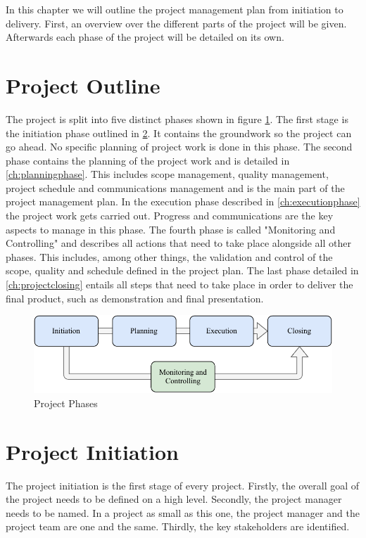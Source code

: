 In this chapter we will outline the project management plan from initiation to delivery. First, an overview over the different parts of the project will be given. Afterwards each phase of the project will be detailed on its own.

\section{Project Outline}
\label{ch:projectplanoutline}

The project is split into five distinct phases shown in figure \ref{fig:projectphases}. The first stage is the initiation phase outlined in \ref{ch:projectinitiation}. It contains the groundwork so the project can go ahead. No specific planning of project work is done in this phase. The second phase contains the planning of the project work and is detailed in \ref{ch:planningphase}. This includes scope management, quality management, project schedule and communications management and is the main part of the project management plan. In the execution phase described in \ref{ch:executionphase} the project work gets carried out. Progress and communications are the key aspects to manage in this phase. The fourth phase is called "Monitoring and Controlling" and describes all actions that need to take place alongside all other phases. This includes, among other things, the validation and control of the scope, quality and schedule defined in the project plan. The last phase detailed in \ref{ch:projectclosing} entails all steps that need to take place in order to deliver the final product, such as demonstration and final presentation.

\begin{figure}
  \centering
  \includegraphics{data/figures/project_lifecycle.pdf}
  \caption{Project Phases}
  \label{fig:projectphases}
\end{figure}


\section{Project Initiation}
\label{ch:projectinitiation}
The project initiation is the first stage of every project. Firstly, the overall goal of the project needs to be defined on a high level. Secondly, the project manager needs to be named. In a project as small as this one, the project manager and the project team are one and the same. Thirdly, the key stakeholders are identified.


